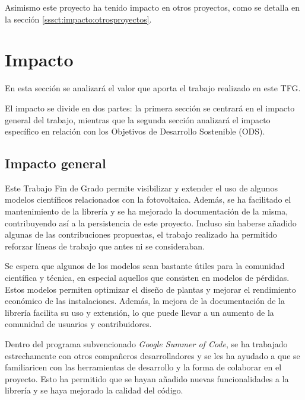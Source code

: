 Asimismo este proyecto ha tenido impacto en otros proyectos, como se detalla en la sección \ref{sssct:impacto:otrosproyectos}.

\section{Impacto} \label{chp:impacto}

En esta sección se analizará el valor que aporta el trabajo realizado en este TFG.

El impacto se divide en dos partes: la primera sección se centrará en el impacto general del trabajo, mientras que la segunda sección analizará el impacto específico en relación con los Objetivos de Desarrollo Sostenible (ODS).


\subsection{Impacto general} \label{sssct:impacto:general}

Este Trabajo Fin de Grado permite visibilizar y extender el uso de algunos modelos científicos relacionados con la fotovoltaica. Además, se ha facilitado el mantenimiento de la librería \pvlibpy{} y se ha mejorado la documentación de la misma, contribuyendo así a la persistencia de este proyecto. Incluso sin haberse añadido algunas de las contribuciones propuestas, el trabajo realizado ha permitido reforzar líneas de trabajo que antes ni se consideraban.

Se espera que algunos de los modelos sean bastante útiles para la comunidad científica y técnica, en especial aquellos que consisten en modelos de pérdidas. Estos modelos permiten optimizar el diseño de plantas y mejorar el rendimiento económico de las instalaciones. Además, la mejora de la documentación de la librería \pvlibpy{} facilita su uso y extensión, lo que puede llevar a un aumento de la comunidad de usuarios y contribuidores.

Dentro del programa subvencionado \textit{Google Summer of Code}, se ha trabajado estrechamente con otros compañeros desarrolladores y se les ha ayudado a que se familiaricen con las herramientas de desarrollo y la forma de colaborar en el proyecto. Esto ha permitido que se hayan añadido nuevas funcionalidades a la librería y se haya mejorado la calidad del código.

